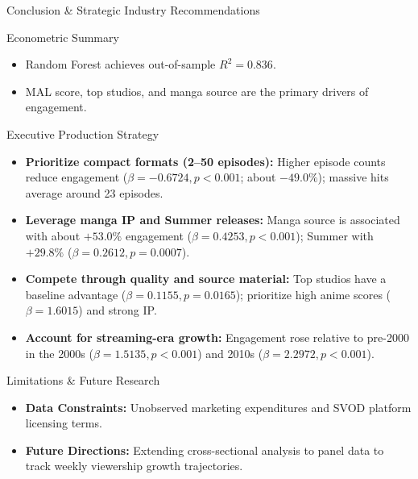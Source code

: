 \documentclass[aspectratio=169,11pt]{beamer}
\begin{document}
\begin{frame}{Conclusion \& Strategic Industry Recommendations}
  \scriptsize
  \begin{block}{Econometric Summary}
    \begin{itemize}
      \item Random Forest achieves out-of-sample $R^2 = 0.836$.
      \item MAL score, top studios, and manga source are the primary drivers
        of engagement.
    \end{itemize}
  \end{block}
  \begin{block}{Executive Production Strategy}
    \tiny
    \begin{itemize}\setlength{\itemsep}{4pt}
      \item \textbf{Prioritize compact formats (2--50 episodes):}
        Higher episode counts reduce engagement
        ($\beta = -0.6724, p < 0.001$; about $-49.0\%$); massive hits average
        around 23 episodes.
      \item \textbf{Leverage manga IP and Summer releases:}
        Manga source is associated with about $+53.0\%$ engagement
        ($\beta = 0.4253, p < 0.001$); Summer with $+29.8\%$
        ($\beta = 0.2612, p = 0.0007$).
      \item \textbf{Compete through quality and source material:}
        Top studios have a baseline advantage
        ($\beta = 0.1155, p = 0.0165$); prioritize high anime scores
        ($\beta = 1.6015$) and strong IP.
      \item \textbf{Account for streaming-era growth:}
        Engagement rose relative to pre-2000 in the 2000s
        ($\beta = 1.5135, p < 0.001$) and 2010s
        ($\beta = 2.2972, p < 0.001$).
    \end{itemize}
  \end{block}
  \begin{block}{Limitations \& Future Research}
    \tiny
    \begin{itemize}\setlength{\itemsep}{0pt}
      \item \textbf{Data Constraints:} Unobserved marketing expenditures and
        SVOD platform licensing terms.
      \item \textbf{Future Directions:} Extending cross-sectional analysis to
        panel data to track weekly viewership growth trajectories.
    \end{itemize}
  \end{block}
\end{frame}
\end{document}
